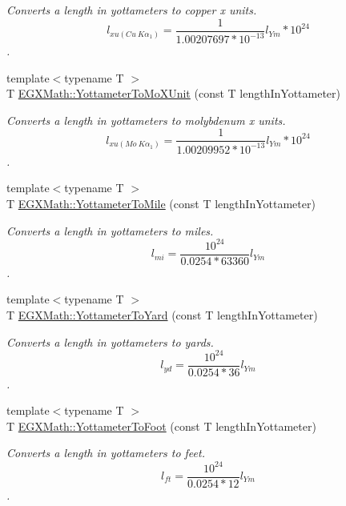 \begin{DoxyCompactItemize}
\begin{DoxyCompactList}\small\item\em Converts a length in yottameters to copper x units. \[ l_{xu(Cu\ K\alpha_1)}= \frac{1}{1.00207697*10^{-13}} l_{Ym} * 10^{24}\]. \end{DoxyCompactList}\item 
{\footnotesize template$<$typename T $>$ }\\T \mbox{\hyperlink{group___e_g_x_math-_conversions-_length_conversions-_s_i-_yottameter-_non-_s_i_ga545da9526f7a62f5ca7d1800faf17d1d}{E\+G\+X\+Math\+::\+Yottameter\+To\+Mo\+X\+Unit}} (const T length\+In\+Yottameter)
\begin{DoxyCompactList}\small\item\em Converts a length in yottameters to molybdenum x units. \[ l_{xu(Mo\ K\alpha_1)}=\frac{1}{1.00209952*10^{-13}} l_{Ym} * 10^{24}\]. \end{DoxyCompactList}\item 
{\footnotesize template$<$typename T $>$ }\\T \mbox{\hyperlink{group___e_g_x_math-_conversions-_length_conversions-_s_i-_yottameter-_imperial_ga4ca41b9b222f31926417df30e0539b50}{E\+G\+X\+Math\+::\+Yottameter\+To\+Mile}} (const T length\+In\+Yottameter)
\begin{DoxyCompactList}\small\item\em Converts a length in yottameters to miles. \[ l_{mi}=\frac{10^{24}}{0.0254 * 63360} l_{Ym} \]. \end{DoxyCompactList}\item 
{\footnotesize template$<$typename T $>$ }\\T \mbox{\hyperlink{group___e_g_x_math-_conversions-_length_conversions-_s_i-_yottameter-_imperial_ga87f19dee341e81a7bb72bf4a5134935f}{E\+G\+X\+Math\+::\+Yottameter\+To\+Yard}} (const T length\+In\+Yottameter)
\begin{DoxyCompactList}\small\item\em Converts a length in yottameters to yards. \[ l_{yd}= \frac{10^{24}}{0.0254 * 36} l_{Ym} \]. \end{DoxyCompactList}\item 
{\footnotesize template$<$typename T $>$ }\\T \mbox{\hyperlink{group___e_g_x_math-_conversions-_length_conversions-_s_i-_yottameter-_imperial_gae693078fe8f9b2ca717732916dcf28d7}{E\+G\+X\+Math\+::\+Yottameter\+To\+Foot}} (const T length\+In\+Yottameter)
\begin{DoxyCompactList}\small\item\em Converts a length in yottameters to feet. \[ l_{ft}= \frac{10^{24}}{0.0254 * 12} l_{Ym} \]. \end{DoxyCompactList}\item 

\end{DoxyCompactItemize}
